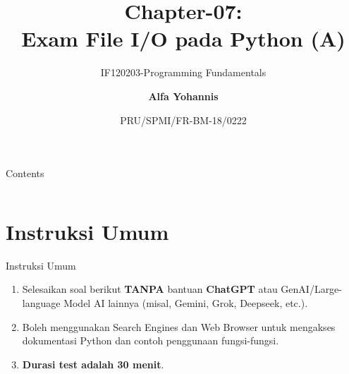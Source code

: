 \documentclass[aspectratio=169, table]{beamer}
\subtitle{IF120203-Programming Fundamentals}
\title{Chapter-07:\\\LARGE{Exam File I/O pada Python (A)\\}
\vspace{10pt}}
\date[Serial]{\scriptsize {PRU/SPMI/FR-BM-18/0222}}
\author[Pradita]{\small{\textbf{Alfa Yohannis}}}
\begin{document}
\frame{\titlepage}

\begin{frame}[fragile]{Contents}
\vspace{15pt}
\begin{columns}[t]
\begin{column}{.4\textwidth}
\tableofcontents[sections={1-4}]
\end{column}
\begin{column}{.6\textwidth}
\tableofcontents[sections={5-7}]
\end{column}
\end{columns}
\end{frame}

\section{Instruksi Umum}
\begin{frame}[fragile]{Instruksi Umum}
\begin{enumerate}
\item Selesaikan soal berikut \textbf{TANPA} bantuan \textbf{ChatGPT} atau GenAI/Large-language Model AI lainnya (misal, Gemini, Grok, Deepseek, etc.).
\item Boleh menggunakan Search Engines dan Web Browser untuk mengakses dokumentasi Python dan contoh penggunaan fungsi-fungsi.
\item \textbf{Durasi test adalah 30 menit}.
\end{enumerate}
\end{frame}
\end{document}
